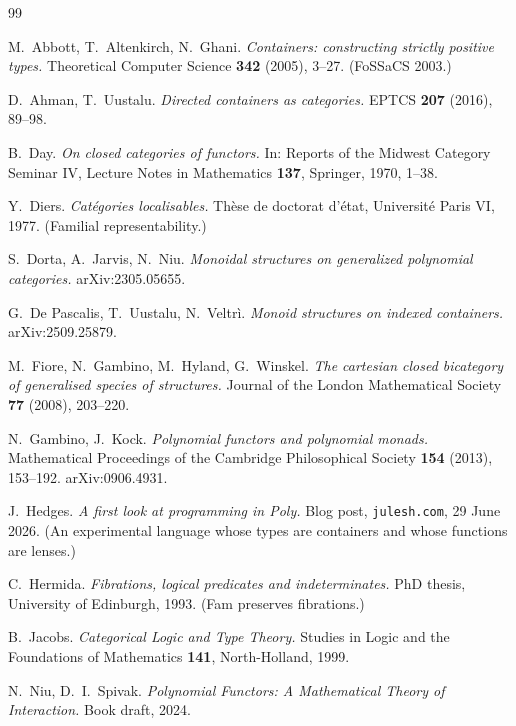 \documentclass[11pt]{amsart}
\theoremstyle{plain}
\theoremstyle{definition}
\theoremstyle{remark}
\begin{document}
\begin{thebibliography}{99}

 M.~Abbott, T.~Altenkirch, N.~Ghani.
\emph{Containers: constructing strictly positive types.}
Theoretical Computer Science \textbf{342} (2005), 3--27. (FoSSaCS 2003.)

 D.~Ahman, T.~Uustalu.
\emph{Directed containers as categories.}
EPTCS \textbf{207} (2016), 89--98.

 B.~Day.
\emph{On closed categories of functors.}
In: Reports of the Midwest Category Seminar IV, Lecture Notes in Mathematics \textbf{137},
Springer, 1970, 1--38.

 Y.~Diers.
\emph{Cat\'egories localisables.}
Th\`ese de doctorat d'\'etat, Universit\'e Paris VI, 1977. (Familial representability.)

 S.~Dorta, A.~Jarvis, N.~Niu.
\emph{Monoidal structures on generalized polynomial categories.}
arXiv:2305.05655.

 G.~De Pascalis, T.~Uustalu, N.~Veltr\`i.
\emph{Monoid structures on indexed containers.}
arXiv:2509.25879.

 M.~Fiore, N.~Gambino, M.~Hyland, G.~Winskel.
\emph{The cartesian closed bicategory of generalised species of structures.}
Journal of the London Mathematical Society \textbf{77} (2008), 203--220.

 N.~Gambino, J.~Kock.
\emph{Polynomial functors and polynomial monads.}
Mathematical Proceedings of the Cambridge Philosophical Society \textbf{154} (2013), 153--192.
arXiv:0906.4931.

 J.~Hedges.
\emph{A first look at programming in Poly.}
Blog post, \texttt{julesh.com}, 29 June 2026. (An experimental language whose types are containers
and whose functions are lenses.)

 C.~Hermida.
\emph{Fibrations, logical predicates and indeterminates.}
PhD thesis, University of Edinburgh, 1993. (Fam preserves fibrations.)

 B.~Jacobs.
\emph{Categorical Logic and Type Theory.}
Studies in Logic and the Foundations of Mathematics \textbf{141}, North-Holland, 1999.

 N.~Niu, D.~I.~Spivak.
\emph{Polynomial Functors: A Mathematical Theory of Interaction.}
Book draft, 2024.


\end{thebibliography}
\end{document}
